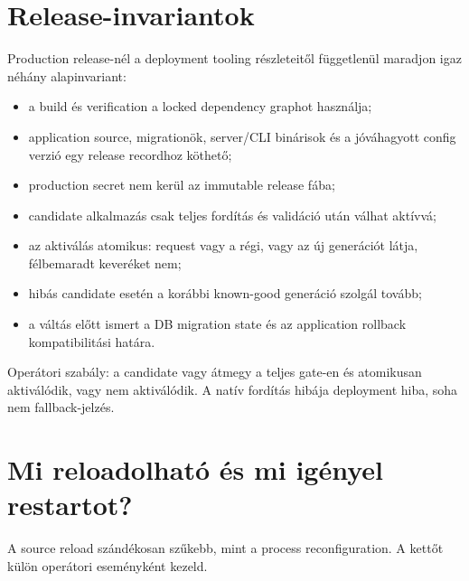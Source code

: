 \section{Release-invariantok}

Production release-nél a deployment tooling részleteitől függetlenül maradjon igaz néhány alapinvariant:

\begin{itemize}
  \item a build és verification a locked dependency graphot használja;
  \item application source, migrationök, server/CLI binárisok és a jóváhagyott config verzió egy release recordhoz köthető;
  \item production secret nem kerül az immutable release fába;
  \item candidate alkalmazás csak teljes fordítás és validáció után válhat aktívvá;
  \item az aktiválás atomikus: request vagy a régi, vagy az új generációt látja, félbemaradt keveréket nem;
  \item hibás candidate esetén a korábbi known-good generáció szolgál tovább;
  \item a váltás előtt ismert a DB migration state és az application rollback kompatibilitási határa.
\end{itemize}

Operátori szabály: a candidate vagy átmegy a teljes gate-en és atomikusan aktiválódik, vagy nem aktiválódik. A natív fordítás hibája deployment hiba, soha nem fallback-jelzés.

\section{Mi reloadolható és mi igényel restartot?}

A source reload szándékosan szűkebb, mint a process reconfiguration. A kettőt külön operátori eseményként kezeld.

